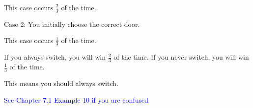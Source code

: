 \documentclass{exam}
\begin{document}
\begin{questions}
\begin{center}
This case occurs \(\frac{2}{3}\) of the time.
\vspace{10px}

Case 2: You initially choose the correct door.

This case occurs \(\frac{1}{3}\) of the time. 
\vspace{10px}

If you always switch, you will win \(\frac{2}{3}\) of the time. If you never switch, you will win \(\frac{1}{3}\) of the time.

This means you should always switch.

\textcolor{blue}{See Chapter 7.1 Example 10 if you are confused}

\end{center}

\end{questions}
\vspace{5px}
\begin{center} 
\end{center}
\end{document}
